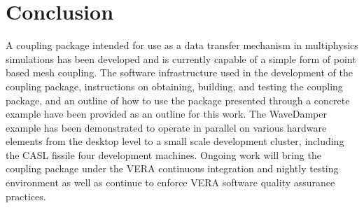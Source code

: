\documentclass[letterpaper]{article}
\begin{document}
\section{Conclusion}
A coupling package intended for use as a data transfer mechanism in
multiphysics simulations has been developed and is currently capable
of a simple form of  point based mesh coupling. The software
infrastructure used in the development of the coupling package,
instructions on obtaining, building, and testing the coupling package,
and an outline of how to use the package presented through a concrete
example have been provided as an outline for this work. The WaveDamper
example has been demonstrated to operate in parallel on various
hardware elements from the desktop level to a small scale development
cluster, including the CASL fissile four development machines. Ongoing
work will bring the coupling package under the VERA continuous
integration and nightly testing environment as well as continue to
enforce VERA software quality assurance practices. 

\pagebreak


\end{document}
